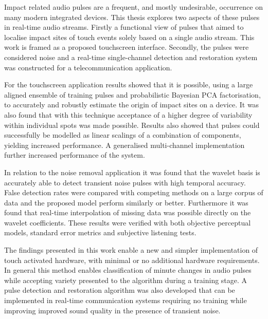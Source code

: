 

\begin{thesissummary}
Impact related audio pulses are a frequent, and mostly undesirable, occurrence on many modern integrated devices. This thesis explores two aspects of these pulses in real-time audio streams. Firstly a functional view of pulses that aimed to localise impact sites of touch events solely based on a single audio stream. This work is framed as a proposed touchscreen interface. Secondly, the pulses were considered noise and a real-time single-channel detection and restoration system was constructed for a telecommunication application.

For the touchscreen application results showed that it is possible, using a large aligned ensemble of training pulses and probabilistic Bayesian PCA factorisation, to accurately and robustly estimate the origin of impact sites on a device. It was also found that with this technique acceptance of a higher degree of variability within individual spots was made possible. Results also showed that pulses could successfully be modelled as linear scalings of a combination of components, yielding increased performance. A generalised multi-channel implementation further increased performance of the system.

In relation to the noise removal application it was found that the wavelet basis is accurately able to detect transient noise pulses with high temporal accuracy. False detection rates were compared with competing methods on a large corpus of data and the proposed model perform similarly or better. Furthermore it was found that real-time interpolation of missing data was possible directly on the wavelet coefficients. These results were verified with both objective perceptual models, standard error metrics and subjective listening tests.

The findings presented in this work enable a new and simpler implementation of touch activated hardware, with minimal or no additional hardware requirements. In general this method enables classification of minute changes in audio pulses while accepting variety presented to the algorithm during a training stage. A pulse detection and restoration algorithm was also developed that can be implemented in real-time communication systems requiring no training while improving improved sound quality in the presence of transient noise.

\end{thesissummary}






